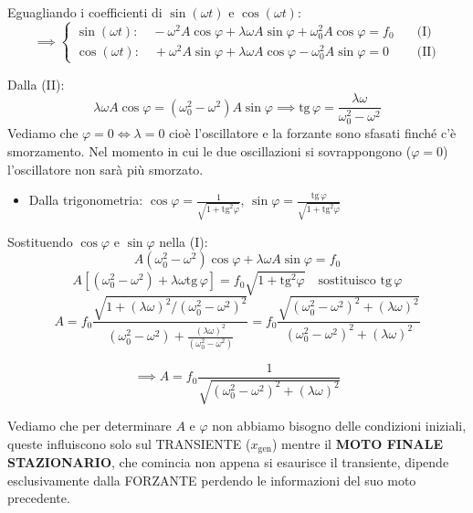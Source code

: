 \documentclass{article}
\begin{document}
Eguagliando i coefficienti di $\sin(\omega t)$ e $\cos(\omega t)$:
\begin{equation*}
\implies
\begin{cases}
\sin(\omega t): \quad -\omega^2 A \cos\varphi + \lambda \omega A \sin\varphi + \omega_0^2 A \cos\varphi = f_0 \quad &\text{(I)} \\
\cos(\omega t): \quad +\omega^2 A \sin\varphi + \lambda \omega A \cos\varphi - \omega_0^2 A \sin\varphi = 0 \quad &\text{(II)}
\end{cases}
\end{equation*}

Dalla (II):
\begin{equation*}
\lambda \omega A \cos\varphi = (\omega_0^2 - \omega^2) A \sin\varphi \implies \text{tg}\,\varphi = \frac{\lambda \omega}{\omega_0^2 - \omega^2}
\end{equation*}
Vediamo che $\varphi = 0 \iff \lambda = 0$ cioè l'oscillatore e la forzante sono sfasati finché c'è smorzamento. Nel momento in cui le due oscillazioni si sovrappongono ($\varphi=0$) l'oscillatore non sarà più smorzato.

\begin{itemize}
\item Dalla trigonometria: $\cos\varphi = \frac{1}{\sqrt{1+\text{tg}^2\varphi}}$, \quad $\sin\varphi = \frac{\text{tg}\,\varphi}{\sqrt{1+\text{tg}^2\varphi}}$
\end{itemize}

Sostituendo $\cos\varphi$ e $\sin\varphi$ nella (I):
\begin{equation*}
A(\omega_0^2 - \omega^2) \cos\varphi + \lambda \omega A \sin\varphi = f_0
\end{equation*}
\begin{equation*}
A \left[ (\omega_0^2 - \omega^2) + \lambda \omega \text{tg}\,\varphi \right] = f_0 \sqrt{1+\text{tg}^2\varphi} \quad \text{sostituisco } \text{tg}\,\varphi
\end{equation*}
\begin{equation*}
A = f_0 \frac{\sqrt{1 + (\lambda \omega)^2 / (\omega_0^2 - \omega^2)^2}}{(\omega_0^2 - \omega^2) + \frac{(\lambda \omega)^2}{(\omega_0^2 - \omega^2)}} = f_0 \frac{\sqrt{(\omega_0^2 - \omega^2)^2 + (\lambda \omega)^2}}{(\omega_0^2 - \omega^2)^2 + (\lambda \omega)^2}
\end{equation*}

\begin{equation*}
\implies A = f_0 \frac{1}{\sqrt{(\omega_0^2 - \omega^2)^2 + (\lambda \omega)^2}}
\end{equation*}

Vediamo che per determinare $A$ e $\varphi$ non abbiamo bisogno delle condizioni iniziali, queste influiscono solo sul TRANSIENTE ($x_{\text{gen}}$) mentre il \textbf{MOTO FINALE STAZIONARIO}, che comincia non appena si esaurisce il transiente, dipende esclusivamente dalla FORZANTE perdendo le informazioni del suo moto precedente.
\end{document}
